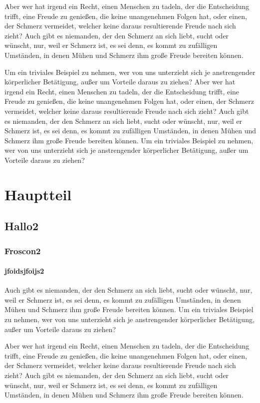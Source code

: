 \documentclass[12pt]{scrreprt}
\begin{document}
Aber wer hat irgend ein Recht, einen Menschen zu tadeln, der die Entscheidung trifft, eine Freude zu genießen, die keine unangenehmen Folgen hat, oder einen, der Schmerz vermeidet, welcher keine daraus resultierende Freude nach sich zieht? Auch gibt es niemanden, der den Schmerz an sich liebt, sucht oder wünscht, nur, weil er Schmerz ist, es sei denn, es kommt zu zufälligen Umständen, in denen Mühen und Schmerz ihm große Freude bereiten können.

Um ein triviales Beispiel zu nehmen, wer von uns unterzieht sich je anstrengender körperlicher Betätigung, außer um Vorteile daraus zu ziehen? Aber wer hat irgend ein Recht, einen Menschen zu tadeln, der die Entscheidung trifft, eine Freude zu genießen, die keine unangenehmen Folgen hat, oder einen, der Schmerz vermeidet, welcher keine daraus resultierende Freude nach sich zieht? Auch gibt es niemanden, der den Schmerz an sich liebt, sucht oder wünscht, nur, weil er Schmerz ist, es sei denn, es kommt zu zufälligen Umständen, in denen Mühen und Schmerz ihm große Freude bereiten können. Um ein triviales Beispiel zu nehmen, wer von uns unterzieht sich je anstrengender körperlicher Betätigung, außer um Vorteile daraus zu ziehen?

\chapter{Hauptteil}

\section{Hallo2}

\subsection{Froscon2}

\subsubsection{jfoidsjfoijs2}

Auch gibt es niemanden, der den Schmerz an sich liebt, sucht oder wünscht, nur, weil er Schmerz ist, es sei denn, es kommt zu zufälligen Umständen, in denen Mühen und Schmerz ihm große Freude bereiten können. Um ein triviales Beispiel zu nehmen, wer von uns unterzieht sich je anstrengender körperlicher Betätigung, außer um Vorteile daraus zu ziehen?

Aber wer hat irgend ein Recht, einen Menschen zu tadeln, der die Entscheidung trifft, eine Freude zu genießen, die keine unangenehmen Folgen hat, oder einen, der Schmerz vermeidet, welcher keine daraus resultierende Freude nach sich zieht? Auch gibt es niemanden, der den Schmerz an sich liebt, sucht oder wünscht, nur, weil er Schmerz ist, es sei denn, es kommt zu zufälligen Umständen, in denen Mühen und Schmerz ihm große Freude bereiten können.
\end{document}
